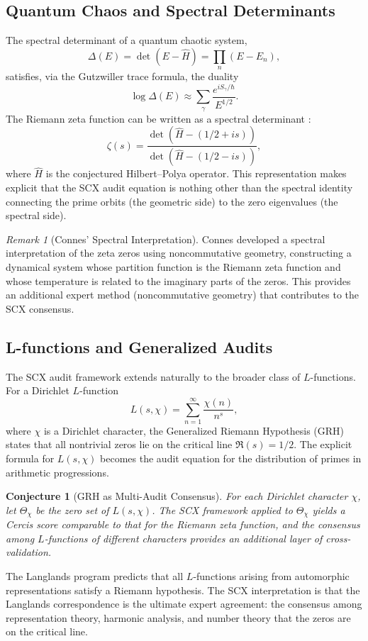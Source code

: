 \documentclass[12pt,a4paper]{article}
\newtheorem{conjecture}[theorem]{Conjecture}
\theoremstyle{remark}
\newtheorem{remark}[theorem]{Remark}
\begin{document}
\subsection{Quantum Chaos and Spectral Determinants}
\label{sec:quantum_chaos}
The spectral determinant of a quantum chaotic system,
\[
\Delta(E) = \det(E - \widehat{H}) = \prod_{n} (E - E_n),
\]
satisfies, via the Gutzwiller trace formula, the duality
\[
\log \Delta(E) \approx \sum_{\gamma} \frac{e^{i S_{\gamma}/\hbar}}{E^{1/2}}.
\]
The Riemann zeta function can be written as a spectral determinant
\cite{Voros1987, Connes1999}:
\[
\zeta(s) = \frac{\det(\widehat{H} - (1/2 + is))}{\det(\widehat{H} - (1/2 - is))},
\]
where $\widehat{H}$ is the conjectured Hilbert--Polya operator. This
representation makes explicit that the SCX audit equation is nothing other
than the spectral identity connecting the prime orbits (the geometric side)
to the zero eigenvalues (the spectral side).
\begin{remark}[Connes' Spectral Interpretation]
\label{rem:connes}
Connes \cite{Connes1999} developed a spectral interpretation of the zeta
zeros using noncommutative geometry, constructing a dynamical system whose
partition function is the Riemann zeta function and whose temperature is
related to the imaginary parts of the zeros. This provides an additional
expert method (noncommutative geometry) that contributes to the SCX
consensus.
\end{remark}
\subsection{L-functions and Generalized Audits}
\label{sec:l_functions}
The SCX audit framework extends naturally to the broader class of
$L$-functions. For a Dirichlet $L$-function
\[
L(s, \chi) = \sum_{n=1}^{\infty} \frac{\chi(n)}{n^{s}},
\]
where $\chi$ is a Dirichlet character, the Generalized Riemann Hypothesis
(GRH) states that all nontrivial zeros lie on the critical line
$\Re(s) = 1/2$. The explicit formula for $L(s, \chi)$ becomes the audit
equation for the distribution of primes in arithmetic progressions.
\begin{conjecture}[GRH as Multi-Audit Consensus]
\label{conj:grh}
For each Dirichlet character $\chi$, let $\Theta_{\chi}$ be the zero set of
$L(s, \chi)$. The SCX framework applied to $\Theta_{\chi}$ yields a Cercis
score comparable to that for the Riemann zeta function, and the consensus
among $L$-functions of different characters provides an additional layer
of cross-validation.
\end{conjecture}
The Langlands program \cite{Langlands1970} predicts that all $L$-functions
arising from automorphic representations satisfy a Riemann hypothesis. The
SCX interpretation is that the Langlands correspondence is the ultimate
expert agreement: the consensus among representation theory, harmonic
analysis, and number theory that the zeros are on the critical line.
\end{document}
